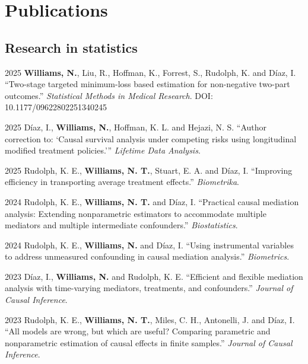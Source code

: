 \documentclass[12pt,letterpaper]{report}
\begin{document}
    \section*{Publications}
    
    \subsection*{Research in statistics}
    
    \begin{tablist}
   
    \item[2025] \tab \textbf{Williams, N.}, Liu, R., Hoffman, K., Forrest, S., Rudolph, K. and Díaz, I. \enquote{Two-stage targeted minimum-loss based estimation for non-negative two-part outcomes.} \textit{Statistical Methods in Medical Research}. DOI: 10.1177/09622802251340245
    
    \item[2025] \tab Díaz, I., \textbf{Williams, N.}, Hoffman, K. L. and Hejazi, N. S. \enquote{Author correction to: `Causal survival analysis under competing risks using longitudinal modified treatment policies.'} \textit{Lifetime Data Analysis}.
    
    \item[2025] \tab Rudolph, K. E., \textbf{Williams, N. T.}, Stuart, E. A. and Díaz, I. \enquote{Improving efficiency in transporting average treatment effects.} \textit{Biometrika}.
    
    \item[2024] \tab Rudolph, K. E., \textbf{Williams, N. T.} and Díaz, I. \enquote{Practical causal mediation analysis: Extending nonparametric estimators to accommodate multiple mediators and multiple intermediate confounders.} \textit{Biostatistics}.
    
    \item[2024] \tab Rudolph, K. E., \textbf{Williams, N.} and Díaz, I. \enquote{Using instrumental variables to address unmeasured confounding in causal mediation analysis.} \textit{Biometrics}.
    
    \item[2023] \tab Díaz, I., \textbf{Williams, N.} and Rudolph, K. E. \enquote{Efficient and flexible mediation analysis with time-varying mediators, treatments, and confounders.} \textit{Journal of Causal Inference}.
    
    \item[2023] \tab Rudolph, K. E., \textbf{Williams, N. T.}, Miles, C. H., Antonelli, J. and Díaz, I. \enquote{All models are wrong, but which are useful? Comparing parametric and nonparametric estimation of causal effects in finite samples.} \textit{Journal of Causal Inference}.
    

\end{tablist}
\end{document}
